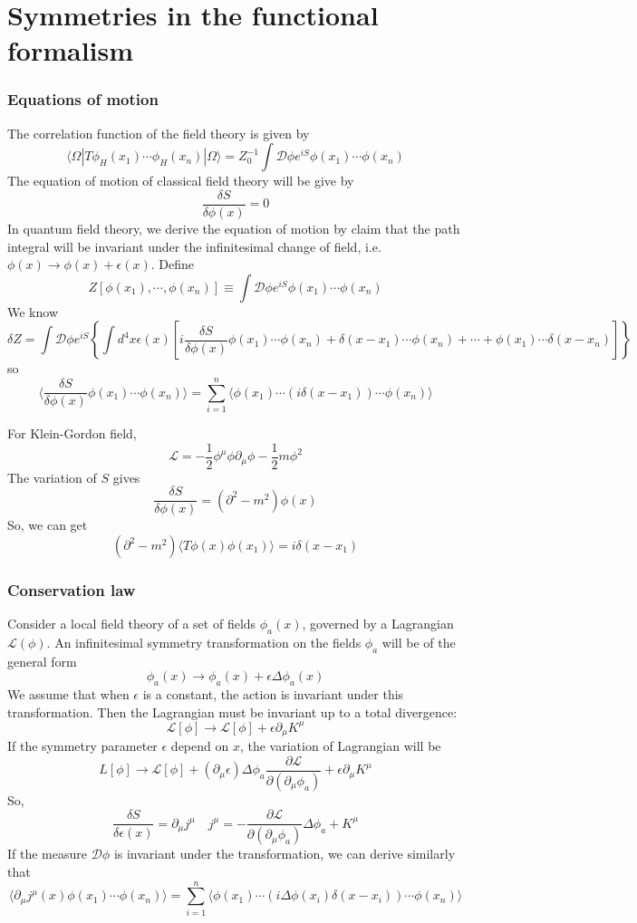 \section{Symmetries in the functional formalism}
\subsubsection{Equations of motion}
\noindent
The correlation function of the field theory is given by
\[\langle \Omega | T \phi_H(x_1) \cdots \phi_H(x_n) | \Omega \rangle = Z_0^{-1} \int \mathcal{D}\phi e^{iS} \phi(x_1)\cdots\phi(x_n)\]
The equation of motion of classical field theory will be give by
\[\frac{\delta S}{\delta \phi(x)} = 0\]
In quantum field theory, we derive the equation of motion by claim that the path integral will be invariant under the infinitesimal change of field, i.e. $\phi(x) \to \phi(x) + \epsilon(x)$.
Define
\[Z[\phi(x_1),\cdots,\phi(x_n)] \equiv  \int \mathcal{D}\phi e^{iS} \phi(x_1)\cdots\phi(x_n)\]
We know
\[\delta Z = \int \mathcal{D}\phi e^{iS} \left\{ \int d^4x \epsilon(x) \left[ i\frac{\delta S}{\delta \phi(x)} \phi(x_1)\cdots\phi(x_n) + \delta(x-x_1)\cdots\phi(x_n) + \cdots + \phi(x_1)\cdots\delta(x-x_n) \right]\right\} \]
so
\[\langle \frac{\delta S}{\delta \phi(x)} \phi(x_1)\cdots\phi(x_n) \rangle  = \sum_{i=1}^{n} \langle \phi(x_1) \cdots (i\delta(x-x_1)) \cdots \phi(x_n) \rangle\]
\begin{example}
For Klein-Gordon field,
\[\mathcal{L} = -\frac{1}{2}\phi^{\mu}\phi \partial_{\mu}\phi - \frac{1}{2}m\phi^2\]
The variation of $S$ gives
\[\frac{\delta S}{\delta \phi(x)} = (\partial^2-m^2)\phi(x)\]
So, we can get
\[(\partial^2-m^2) \langle T \phi(x)\phi(x_1) \rangle = i\delta(x-x_1)\]
\end{example}
\subsubsection{Conservation law}
Consider a local field theory of a set of fields $\phi_a(x)$, governed by a Lagrangian $\mathcal{L}(\phi)$. An infinitesimal symmetry transformation on the fields $\phi_a$ will be of the general form 
\[\phi_a(x) \to \phi_a(x) + \epsilon \Delta \phi_a(x)\]
We assume that when $\epsilon$ is a constant, the action is invariant under this transformation. Then the Lagrangian must be invariant up to a total divergence:
\[\mathcal{L}[\phi] \to \mathcal{L}[\phi] + \epsilon \partial_{\mu} K^{\mu}\]
If the symmetry parameter $\epsilon$ depend on $x$, the variation of Lagrangian will be
\[L[\phi] \to \mathcal{L}[\phi] + (\partial_{\mu}\epsilon)\Delta \phi_a \frac{\partial \mathcal{L}}{\partial (\partial_{\mu}\phi_a)} + \epsilon \partial_{\mu} K^{\mu}\]
So, 
\[\frac{\delta S}{\delta \epsilon(x)} = \partial_{\mu} j^{\mu} \quad j^{\mu} = -\frac{\partial \mathcal{L}}{\partial (\partial_{\mu}\phi_a)}\Delta \phi_a + K^{\mu} \]
If the measure $\mathcal{D}\phi$ is invariant under the transformation, we can derive similarly that
\[\langle \partial_{\mu} j^{\mu}(x) \phi(x_1)\cdots\phi(x_n) \rangle  = \sum_{i=1}^{n} \langle \phi(x_1) \cdots (i\Delta \phi(x_i)\delta(x-x_i)) \cdots \phi(x_n) \rangle\]

